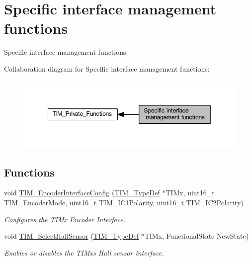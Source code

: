 \hypertarget{group___t_i_m___group8}{}\section{Specific interface management functions}
\label{group___t_i_m___group8}


Specific interface management functions.  


Collaboration diagram for Specific interface management functions\+:\nopagebreak
\begin{figure}[H]
\begin{center}
\leavevmode
\includegraphics[width=349pt]{group___t_i_m___group8}
\end{center}
\end{figure}
\subsection*{Functions}
\begin{DoxyCompactItemize}
\item 
void \hyperlink{group___t_i_m___group8_ga0fc7e76c47a3bd1ba1ebc71427832b51}{T\+I\+M\+\_\+\+Encoder\+Interface\+Config} (\hyperlink{struct_t_i_m___type_def}{T\+I\+M\+\_\+\+Type\+Def} $\ast$T\+I\+Mx, uint16\+\_\+t T\+I\+M\+\_\+\+Encoder\+Mode, uint16\+\_\+t T\+I\+M\+\_\+\+I\+C1\+Polarity, uint16\+\_\+t T\+I\+M\+\_\+\+I\+C2\+Polarity)
\begin{DoxyCompactList}\small\item\em Configures the T\+I\+Mx Encoder Interface. \end{DoxyCompactList}\item 
void \hyperlink{group___t_i_m___group8_ga42c2d1025a3937c9d9f38631af86ffa4}{T\+I\+M\+\_\+\+Select\+Hall\+Sensor} (\hyperlink{struct_t_i_m___type_def}{T\+I\+M\+\_\+\+Type\+Def} $\ast$T\+I\+Mx, Functional\+State New\+State)
\begin{DoxyCompactList}\small\item\em Enables or disables the T\+I\+Mx\textquotesingle{}s Hall sensor interface. \end{DoxyCompactList}\end{DoxyCompactItemize}


